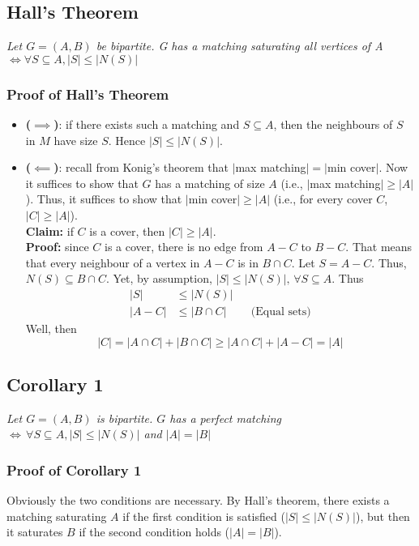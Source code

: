 \documentclass{report}
\begin{document}
\subsection{Hall's Theorem}
\begin{center}
\textit{Let $G = (A,B)$ be bipartite. G has a matching saturating all vertices of A $\iff \forall S \subseteq A, |S| \leq |N(S)|$}
\end{center}
\subsubsection{Proof of Hall's Theorem}
\begin{itemize}
\item \textbf{($\implies$)}: if there exists such a matching and $S \subseteq A$, then the neighbours of $S$ in $M$ have size $S$. Hence $|S| \leq |N(S)|$.
\item \textbf{($\impliedby$)}: recall from Konig's theorem that $|$max matching$| = |$min cover$|$. Now it suffices to show that $G$ has a matching of size $A$ (i.e., $|$max matching$| \geq |A|$). Thus, it suffices to show that $|$min cover$| \geq |A|$ (i.e., for every cover $C$, $|C| \geq |A|$).\\
\textbf{Claim:} if $C$ is a cover, then $|C| \geq |A|$.\\
\textbf{Proof:} since $C$ is a cover, there is no edge from $A-C$ to $B-C$. That means that every neighbour of a vertex in $A-C$ is in $B \cap C$. Let $S = A-C$. Thus, $N(S) \subseteq B\cap C$. Yet, by assumption, $|S| \leq |N(S)|, \, \forall S \subseteq A$. Thus
\begin{align*}
|S| &\leq |N(S)| \\
|A-C| &\leq |B \cap C| && \text{(Equal sets)}
\end{align*}
Well, then
$$|C| = |A \cap C| + |B \cap C| \geq |A \cap C| + |A - C| = |A|$$
\end{itemize}
\subsection{Corollary 1}
\begin{center}
\textit{Let $G = (A,B)$ is bipartite. $G$ has a perfect matching $\iff \, \forall S \subseteq A, |S| \leq|N(S)| $ and $|A|=|B|$}
\end{center}
\subsubsection{Proof of Corollary 1}
Obviously the two conditions are necessary. By Hall's theorem, there exists a matching saturating $A$ if the first condition is satisfied ($|S| \leq|N(S)|$), but then it saturates $B$ if the second condition holds ($|A|=|B|$).
\end{document}
